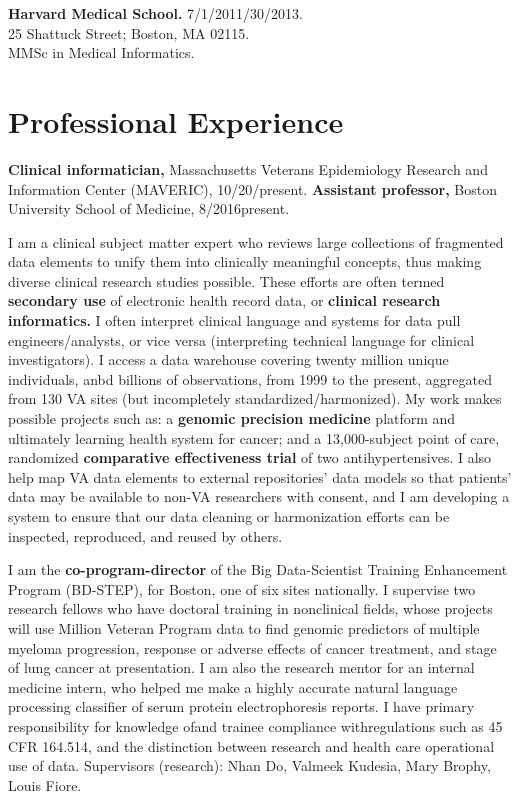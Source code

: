 \documentclass[10pt]{article}
\begin{document}
\textbf{Harvard Medical School.} 7/1/2011/30/2013.\\
25 Shattuck Street; Boston, MA 02115.\\
MMSc in Medical Informatics.

\section*{Professional Experience} %

\textbf{Clinical informatician,} Massachusetts Veterans Epidemiology
Research and Information Center (MAVERIC),
10/20/\ndash{}present. \textbf{Assistant professor,}
Boston University School of Medicine, 8/2016\ndash{}present.

I am a clinical subject matter expert who reviews large collections of
fragmented data elements to unify them into clinically meaningful
concepts, thus making diverse clinical research studies possible.
These efforts are often termed \textbf{secondary use} of electronic
health record data, or \textbf{clinical research informatics.} I often
interpret clinical language and systems for data pull
engineers/analysts, or vice versa (interpreting technical language for
clinical investigators). I access a data warehouse covering twenty
million unique individuals, anbd billions of observations, from 1999 to the present, aggregated from
130 VA sites (but incompletely standardized/harmonized). My work makes
possible projects such as: a \textbf{genomic precision medicine} platform and
ultimately learning health system for cancer; and a 13,000-subject
point of care, randomized \textbf{comparative effectiveness trial} of two
antihypertensives. I also help map VA data elements to external
repositories' data models so that patients' data may be available to non-VA
researchers with consent, and I am developing a system to ensure that our data
cleaning or harmonization efforts can be inspected, reproduced, and reused by
others.

I am the \textbf{co-program-director} of the Big Data-Scientist Training
Enhancement Program (BD-STEP), for Boston, one of six sites
nationally. I supervise two research fellows who have doctoral
training in nonclinical fields, whose projects will use Million
Veteran Program data to find genomic predictors of multiple myeloma
progression, response or adverse effects of cancer treatment, and stage of lung cancer at presentation. I am
also the research mentor for an internal medicine intern, who helped
me make a highly accurate natural language processing classifier of
serum protein electrophoresis reports. I have primary responsibility for knowledge of\mdash{}and trainee compliance with\mdash{}regulations such as 45 CFR 164.514, and the distinction between research and health care operational use of data. Supervisors (research): Nhan
Do, Valmeek Kudesia, Mary Brophy, Louis Fiore.
\end{document}
